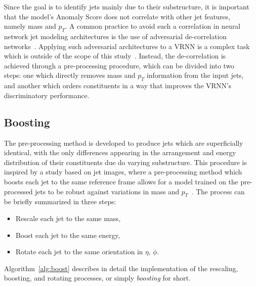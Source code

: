 \documentclass[12pt, a4paper]{article}
\begin{document}
Since the goal is to identify jets mainly due to their substructure, it is important that the model's Anomaly Score does not correlate with other jet features, namely mass and $p_{T}$. A common practice to avoid such a correlation in neural network jet modeling architectures is the use of adversarial de-correlation networks~\cite{adversarial}. Applying such adversarial architectures to a VRNN is a complex task which is outside of the scope of this study~\cite{Purushotham2017VariationalRA}. Instead, the de-correlation is achieved through a pre-processing procedure, which can be divided into two steps: one which directly removes mass and $p_{T}$ information from the input jets, and another which orders constituents in a way that improves the VRNN's discriminatory performance.

\subsection{Boosting}

The pre-processing method is developed to produce jets which are superficially identical, with the only differences appearing in the arrangement and energy distribution of their constituents due do varying substructure. This procedure is inspired by a study based on jet images, where a pre-processing method which boosts each jet to the same reference frame allows for a model trained on the pre-processed jets to be robust against variations in mass and $p_{T}$~\cite{roy2020robust}. The process can be briefly summarized in three steps:

\begin{itemize}
	\item{Rescale each jet to the same mass,}
	\item{Boost each jet to the same energy,}
	\item{Rotate each jet to the same orientation in $\eta$, $\phi$.}
\end{itemize}

Algorithm~\ref{alg:boost} describes in detail the implementation of the rescaling, boosting, and rotating processes, or simply \textit{boosting} for short. 
\end{document}
